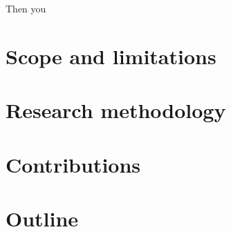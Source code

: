 Then you 

%	

\section{Scope and limitations}



\section{Research methodology}

\section{Contributions}

\section{Outline}
